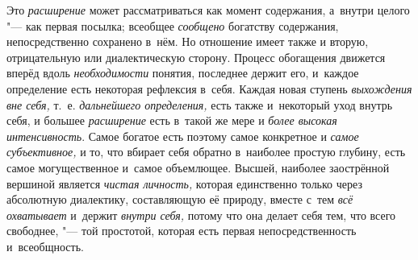 Это {\em расширение} может рассматриваться как момент содержания, а~внутри
целого "--- как первая посылка; всеобщее {\em сообщено} богатству
содержания, непосредственно сохранено в~нём. Но отношение имеет также и
вторую, отрицательную или диалектическую сторону. Процесс обогащения
движется вперёд вдоль {\em необходимости}
понятия, последнее держит его, и~каждое определение есть
некоторая рефлексия в~себя. Каждая новая ступень
{\em выхождения вне себя,} т.~е. {\em дальнейшего
определения,} есть также и~некоторый уход внутрь себя, и
большее {\em расширение} есть в~такой же мере и
{\em более высокая интенсивность}.
Самое богатое есть поэтому самое конкретное и {\em самое субъективное,}
и то, что вбирает себя обратно в~наиболее простую глубину,
есть самое могущественное и~самое объемлющее. Высшей, наиболее заострённой
вершиной является {\em чистая
личность,} которая единственно только через абсолютную
диалектику, составляющую её природу, вместе с~тем
{\em всё охватывает} и~держит {\em внутри себя,}
потому что она делает себя тем, что всего свободнее, "---
той простотой, которая есть первая непосредственность и~всеобщность.

